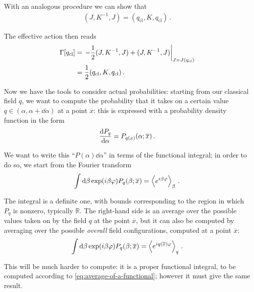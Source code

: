 \documentclass[main.tex]{subfiles}
\begin{document}
With an analogous procedure we can show that
%
\begin{align}
(J, K^{-1}, J) = (q _{\text{cl}}, K, q _{\text{cl}})
\,.
\end{align}


The effective action then reads
%
\begin{align}
\Gamma [q _{\text{cl}}] &= \eval{- \frac{1}{2} (J, K^{-1}, J) + (J, K^{-1}, J)}_{J = J(q _{\text{cl}})} \\
&= \frac{1}{2} (q _{\text{cl}}, K, q _{\text{cl}})
\,.
\end{align}

Now we have the tools to consider actual probabilities: starting from our classical field \(q\), we want to compute the probability that it takes on a certain value \(q \in (\alpha , \alpha + \dd{\alpha })\) at a point \(\overline{x}\): this is expressed with a probability density function in the form 
%
\begin{align}
\dv{P_q}{\alpha } =P_{q(x)} (\alpha; \overline{x})
\,.
\end{align}

We want to write this ``\(P(\alpha ) \dd{\alpha }\)'' in terms of the functional integral; in order to do so, we start from the Fourier transform 
%
\begin{align}
\int \dd{\beta } \exp(i \beta \varphi ) P_q (\beta ; \overline{x}) = \expval{e^{i \beta \varphi }}_{\beta }
\,.
\end{align}

The integral is a definite one, with bounds corresponding to the region in which \(P_q\) is nonzero, typically \(\mathbb{R}\).
The right-hand side is an average over the possible values taken on by the field \(q\) at the point \(\overline{x}\), but it can also be computed by averaging over the possible \emph{overall} field configurations, computed at a point \(\overline{x}\):
%
\begin{align}
\int \dd{\beta } \exp(i \beta \varphi ) P_q (\beta ; \overline{x}) = \expval{e^{i q(\overline{x}) \varphi }}_{q }
\,.
\end{align}

This will be much harder to compute: it is a proper functional integral, to be computed according to \eqref{eq:average-of-a-functional}; however it must give the same result.
\end{document}
